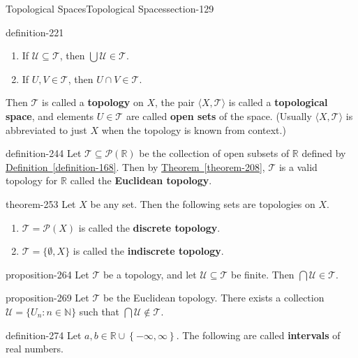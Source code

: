 \documentclass[oneside,10pt,]{article}
\newcommand{\terminology}[1]{\textbf{#1}}
\newcommand{\tuple}[1]{\langle #1 \rangle}
\newcommand{\mb}{\mathbb}
\newcommand{\mc}{\mathcal}
\newcommand{\setList}[1]{\left\{#1\right\}}
\begin{document}
\begin{sectionptx}{Topological Spaces}{}{Topological Spaces}{}{}{section-129}
\begin{definition}{}{definition-221}
\begin{enumerate}
\item\hypertarget{li-228}{}If \(\mc U\subseteq\mc T\), then \(\bigcup\mc U\in\mc T\).%
\item\hypertarget{li-231}{}If \(U,V\in\mc T\), then \(U\cap V\in\mc T\).%
\end{enumerate}
\hypertarget{p-234}{}%
Then \(\mc T\) is called a \terminology{topology} on \(X\), the pair \(\tuple{X,\mc T}\) is called a \terminology{topological space}, and elements \(U\in\mc T\) are called \terminology{open sets} of the space. (Usually \(\tuple{X,\mc T}\) is abbreviated to just \(X\) when the topology is known from context.)%
\end{definition}
\begin{definition}{}{definition-244}%
\hypertarget{p-245}{}%
Let \(\mc T\subseteq\mc P(\mb R)\) be the collection of open subsets of \(\mb R\) defined by \hyperref[definition-168]{Definition~\ref{definition-168}}. Then by \hyperref[theorem-208]{Theorem~\ref{theorem-208}}, \(\mc T\) is a valid topology for \(\mb R\) called the \terminology{Euclidean topology}.%
\end{definition}
\begin{theorem}{}{}{theorem-253}%
\hypertarget{p-254}{}%
Let \(X\) be any set. Then the following sets are topologies on \(X\).%
\leavevmode%
\begin{enumerate}
\item\hypertarget{li-258}{}\(\mc T=\mc P(X)\) is called the \terminology{discrete topology}.%
\item\hypertarget{li-261}{}\(\mc T=\{\emptyset,X\}\) is called the \terminology{indiscrete topology}.%
\end{enumerate}
\end{theorem}
\begin{proposition}{}{}{proposition-264}%
\hypertarget{p-265}{}%
Let \(\mc T\) be a topology, and let \(\mc U\subseteq\mc T\) be finite. Then \(\bigcap\mc U\in\mc T\).%
\end{proposition}
\begin{proposition}{}{}{proposition-269}%
\hypertarget{p-270}{}%
Let \(\mc T\) be the Euclidean topology. There exists a collection \(\mc U=\{U_n:n\in\mb N\}\) such that \(\bigcap\mc U\not\in\mc T\).%
\end{proposition}
\begin{definition}{}{definition-274}%
\hypertarget{p-275}{}%
Let \(a,b\in\mb R\cup\setList{-\infty,\infty}\). The following are called \terminology{intervals} of real numbers.%
%
\begin{equation*}

\end{equation*}
\end{definition}
\end{sectionptx}
\end{document}
